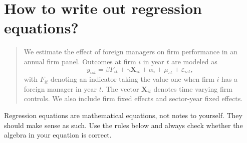 \documentclass[12pt,a4paper]{article}
\begin{document}
\section{How to write out regression equations?}

\begin{quote}
We estimate the effect of foreign managers on firm performance in an annual firm panel. Outcomes at firm $i$ in year $t$ are modeled as
\begin{equation}
	y_{ist} = \beta F_{it} + \gamma \mathbf X_{it} + \alpha_i + \mu_{st} + \varepsilon_{ist},
\end{equation}
with $F_{it}$ denoting an indicator taking the value one when firm $i$ has a foreign manager in year $t$. The vector $\mathbf X_{it}$ denotes time varying firm controls. We also include firm fixed effects and sector-year fixed effects.
\end{quote}

Regression equations are mathematical equations, not notes to yourself. They should make sense as such. Use the rules below and always check whether the algebra in your equation is correct.
\end{document}

